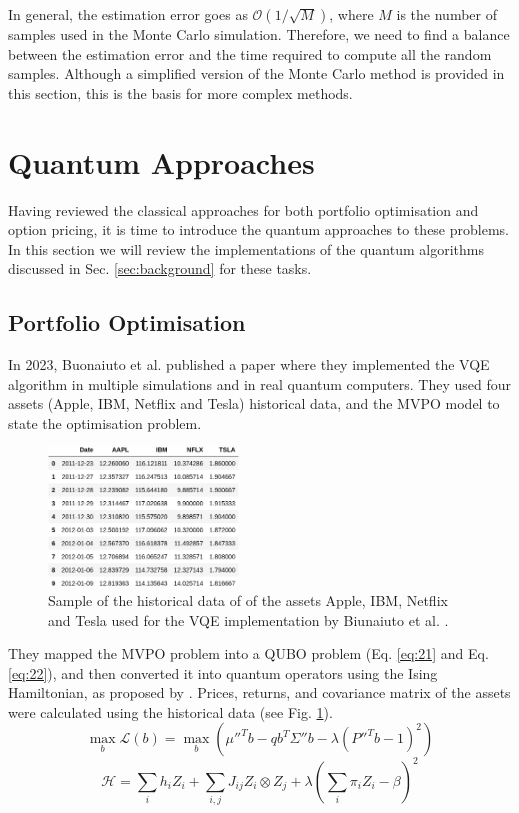 \documentclass[prx,twocolumn,floatfix,superscriptaddress,longbibliography]{revtex4-1}
\begin{document}
In general, the estimation error goes as $\mathcal{O}(1/\sqrt{M})$, where $M$ is the number of samples used in the Monte Carlo simulation. Therefore, we need to find a balance between the estimation error and the time required to compute all the random samples. Although a simplified version of the Monte Carlo method is provided in this section, 
this is the basis for more complex methods. 

\section{Quantum Approaches}\label{sec:literature2}
Having reviewed the classical approaches for both portfolio optimisation and option pricing, it is time to 
introduce the quantum approaches to these problems. In this section we will review the implementations of the quantum algorithms discussed in Sec. \ref{sec:background} for these tasks.
\subsection{Portfolio Optimisation}
In 2023, Buonaiuto et al. \cite{Buonaiuto2023} published a paper where they implemented the VQE algorithm in multiple simulations and in real quantum computers. They used four assets (Apple, IBM, Netflix and Tesla) 
historical data, and the MVPO model to state the optimisation problem. 
\begin{figure}[h!]
\centering 
\includegraphics[width=0.45\textwidth]{data-paper.png}
  \caption{\label{fig:data-set} Sample of the historical data of of the assets Apple, IBM, Netflix and Tesla used for the VQE implementation by 
Biunaiuto et al. \cite{Buonaiuto2023}.}
\end{figure}

They mapped the MVPO problem into a QUBO problem (Eq. \ref{eq:21} and Eq. \ref{eq:22}), and then converted it into quantum operators using 
the Ising Hamiltonian, as proposed by \cite{Tilly2022}.  Prices, returns, and covariance matrix of the assets were calculated using the historical data (see Fig. \ref{fig:data-set}). 
\begin{equation}
  \label{eq:21}
  \max_{b} \mathcal{L}(b) =\max_{b}\left(\mu''^{T} b - qb^{T} \Sigma'' b - \lambda(P''^{T}b- 1)^2\right)
\end{equation}
\begin{equation}
  \label{eq:22}
  \mathcal{H} = \sum_{i} h_i Z_i + \sum_{i,j} J_{ij} Z_i\otimes Z_j + \lambda \left(\sum_{i}\pi_i Z_i -\beta\right)^2
\end{equation}
\end{document}
